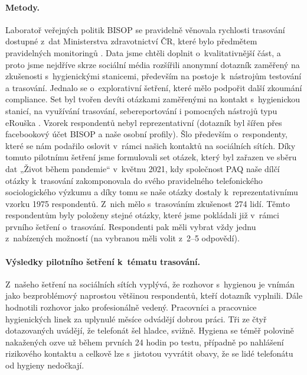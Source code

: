 \paragraph*{Metody.}
Laboratoř veřejných politik BISOP se pravidelně věnovala rychlosti trasování dostupné z~dat Ministerstva zdravotnictví ČR, které bylo předmětem pravidelných monitoringů \cite{Blechova,Blechova2020}. Data jsme chtěli doplnit o~kvalitativnější část, a proto jsme nejdříve skrze sociální média rozšířili anonymní dotazník zaměřený na zkušenosti s~hygienickými stanicemi, především na postoje k~nástrojům testování a trasování. Jednalo se o~explorativní šetření, které mělo podpořit další zkoumání compliance. Set byl tvořen devíti otázkami zaměřenými na kontakt s~hygienickou stanicí, na využívání trasování, sebereportování i pomocných nástrojů typu eRouška \cite{Erouska.cz2020}. Vzorek respondentů nebyl reprezentativní (dotazník byl šířen přes facebookový účet BISOP a naše osobní profily). Šlo především o~respondenty, které se nám podařilo oslovit v~rámci našich kontaktů na sociálních sítích. 
Díky tomuto pilotnímu šetření jsme formulovali set otázek, který byl zařazen ve sběru dat „Život během pandemie“ v~květnu 2021, kdy společnost PAQ \cite{Prokop2021a} naše dílčí otázky k~trasování zakomponovala do svého pravidelného telefonického sociologického výzkumu a díky tomu se naše otázky dostaly k~reprezentativnímu vzorku 1975 respondentů. 
Z~nich mělo s~trasováním zkušenost 274 lidí. Těmto respondentům byly položeny stejné otázky, které jsme pokládali již v~rámci prvního šetření o~trasování. Respondenti pak měli vybrat vždy jednu z~nabízených možností (na vybranou měli volit z~2--5 odpovědí). 

\paragraph*{Výsledky pilotního šetření k~tématu trasování.}
Z~našeho šetření na sociálních sítích vyplývá, že rozhovor s~hygienou je vnímán jako bezproblémový naprostou většinou respondentů, kteří dotazník vyplnili. Dále hodnotili rozhovor jako profesionálně vedený. Pracovníci a pracovnice hygienických linek za uplynulé měsíce odvádějí dobrou práci. Tři ze čtyř dotazovaných uvádějí, že telefonát šel hladce, svižně. Hygiena se téměř polovině nakažených ozve už během prvních 24 hodin po testu, případně po nahlášení rizikového kontaktu a celkově lze s~jistotou vyvrátit obavy, že se lidé telefonátu od hygieny nedočkají.


